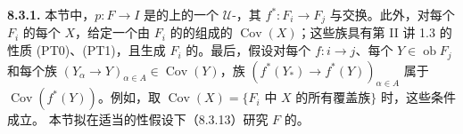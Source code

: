 \textbf{8.3.1.} 本节中，$p:F\to I$ 是的上的一个 $\mathcal U$-，其 $f^*:F_i\to F_j$ 与交换。此外，对每个 $F_i$ 的每个 $X$，给定一个由 $F_i$ 的的组成的 $\operatorname{Cov}(X)$；这些族具有第 II 讲 1.3 的性质 (PT0)、(PT1)，且生成 $F_i$ 的。最后，假设对每个 $f:i\to j$、每个 $Y\in\operatorname{ob}F_j$ 和每个族 $(Y_\alpha\to Y)_{\alpha\in A}\in\operatorname{Cov}(Y)$，族 $(f^*(Y_*)\to f^*(Y))_{\alpha\in A}$ 属于 $\operatorname{Cov}(f^*(Y))$。例如，取 $\operatorname{Cov}(X)=\{\text{$F_i$ 中 $X$ 的所有覆盖族}\}$ 时，这些条件成立。
本节拟在适当的性假设下（8.3.13）研究 $F$ 的。

